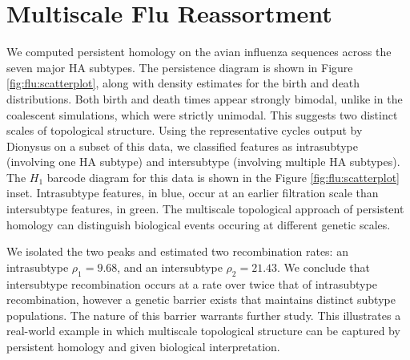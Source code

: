 \section{Multiscale Flu Reassortment}
\label{flu:multiscale_reassortment}

We computed persistent homology on the avian influenza sequences across the seven major HA subtypes.
The persistence diagram is shown in Figure \ref{fig:flu:scatterplot}, along with density estimates for the birth and death distributions.
Both birth and death times appear strongly bimodal, unlike in the coalescent simulations, which were strictly unimodal.
This suggests two distinct scales of topological structure.
Using the representative cycles output by Dionysus on a subset of this data, we classified features as intrasubtype (involving one HA subtype) and intersubtype (involving multiple HA subtypes).
The $H_1$ barcode diagram for this data is shown in the Figure \ref{fig:flu:scatterplot} inset.
Intrasubtype features, in blue, occur at an earlier filtration scale than intersubtype features, in green.
The multiscale topological approach of persistent homology can distinguish biological events occuring at different genetic scales.

We isolated the two peaks and estimated two recombination rates: an intrasubtype $\rho_{1}=9.68$, and an intersubtype $\rho_{2}=21.43$.
We conclude that intersubtype recombination occurs at a rate over twice that of intrasubtype recombination, however a genetic barrier exists that maintains distinct subtype populations.
The nature of this barrier warrants further study.
This illustrates a real-world example in which multiscale topological structure can be captured by persistent homology and given biological interpretation.

